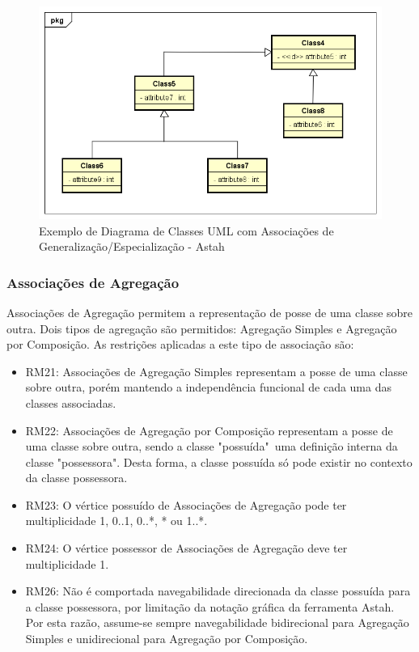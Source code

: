 \begin{figure}
    \begin{center}
        \includegraphics[scale=0.7]{imagens/Example_Realization.png}
    \end{center}
	\caption{\label{fig_example_realization}Exemplo de Diagrama de Classes UML com Associações de Generalização/Especialização - Astah}
\end{figure}


\subsubsection{Associações de Agregação}

Associações de Agregação permitem a representação de posse de uma classe sobre outra. Dois tipos de agregação são permitidos: Agregação Simples e Agregação por Composição. As restrições aplicadas a este tipo de associação são:

\begin{itemize}
    \item RM21: Associações de Agregação Simples representam a posse de uma classe sobre outra, porém mantendo a independência funcional de cada uma das classes associadas.

    \item RM22: Associações de Agregação por Composição representam a posse de uma classe sobre outra, sendo a classe "possuída"\ uma definição interna da classe "possessora". Desta forma, a classe possuída só pode existir no contexto da classe possessora.

    \item RM23: O vértice possuído de Associações de Agregação pode ter multiplicidade 1, 0..1, 0..*, * ou 1..*.

    \item RM24: O vértice possessor de Associações de Agregação deve ter multiplicidade 1.

    \item RM26: Não é comportada navegabilidade direcionada da classe possuída para a classe possessora, por limitação da notação gráfica da ferramenta Astah. Por esta razão, assume-se sempre navegabilidade bidirecional para Agregação Simples e unidirecional para Agregação por Composição.
\end{itemize}

